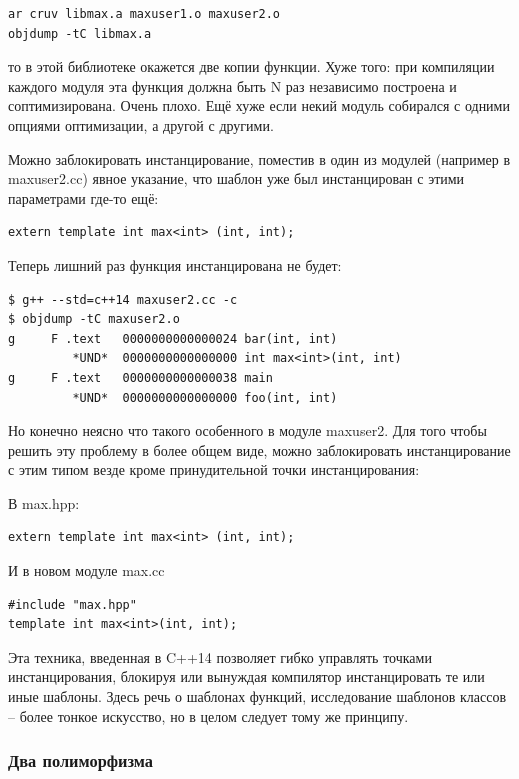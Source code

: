 \documentclass[a4paper,12pt,oneside]{article}
\begin{document}
\begin{verbatim}
ar cruv libmax.a maxuser1.o maxuser2.o
objdump -tC libmax.a
\end{verbatim}

то в этой библиотеке окажется две копии функции. Хуже того: при компиляции каждого модуля эта функция должна быть N раз независимо построена и соптимизирована. Очень плохо. Ещё хуже если некий модуль собирался с одними опциями оптимизации, а другой с другими.

Можно заблокировать инстанцирование, поместив в один из модулей (например в maxuser2.cc) явное указание, что шаблон уже был инстанцирован с этими параметрами где-то ещё:

\begin{lstlisting}
extern template int max<int> (int, int);
\end{lstlisting}

Теперь лишний раз функция инстанцирована не будет:

\begin{verbatim}
$ g++ --std=c++14 maxuser2.cc -c
$ objdump -tC maxuser2.o
g     F .text	0000000000000024 bar(int, int)
         *UND*	0000000000000000 int max<int>(int, int)
g     F .text	0000000000000038 main
         *UND*	0000000000000000 foo(int, int)
\end{verbatim}

Но конечно неясно что такого особенного в модуле maxuser2. Для того чтобы решить эту проблему в более общем виде, можно заблокировать инстанцирование с этим типом везде кроме принудительной точки инстанцирования:

В max.hpp:

\begin{lstlisting}
extern template int max<int> (int, int);
\end{lstlisting}

И в новом модуле max.cc

\begin{lstlisting}
#include "max.hpp"
template int max<int>(int, int);
\end{lstlisting}

Эта техника, введенная в C++14 позволяет гибко управлять точками инстанцирования, блокируя или вынуждая компилятор инстанцировать те или иные шаблоны. Здесь речь о шаблонах функций, исследование шаблонов классов -- более тонкое искусство, но в целом следует тому же принципу.

\subsubsection{Два полиморфизма}\label{TemplatePolymorphism}
\end{document}
